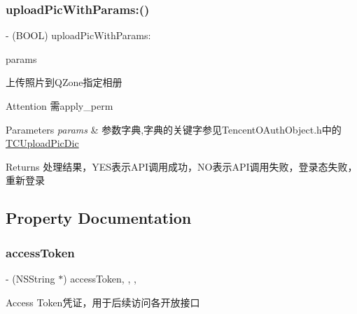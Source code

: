 \subsubsection{\texorpdfstring{upload\+Pic\+With\+Params\+:()}{uploadPicWithParams:()}\hspace{0.1cm}{\footnotesize\ttfamily [2/2]}}
{\footnotesize\ttfamily -\/ (B\+O\+OL) upload\+Pic\+With\+Params\+: \begin{DoxyParamCaption}\item[{(N\+S\+Mutable\+Dictionary $\ast$)}]{params }\end{DoxyParamCaption}}

上传照片到\+Q\+Zone指定相册 \begin{DoxyAttention}{Attention}
需apply\+\_\+perm 
\end{DoxyAttention}

\begin{DoxyParams}{Parameters}
{\em params} & 参数字典,字典的关键字参见\+Tencent\+O\+Auth\+Object.\+h中的\mbox{\hyperlink{interface_t_c_upload_pic_dic}{T\+C\+Upload\+Pic\+Dic}} \\
\hline
\end{DoxyParams}
\begin{DoxyReturn}{Returns}
处理结果，\+Y\+E\+S表示\+A\+P\+I调用成功，\+N\+O表示\+A\+P\+I调用失败，登录态失败，重新登录 
\end{DoxyReturn}


\subsection{Property Documentation}
\mbox{\label{interface_tencent_o_auth_a104b04b7ad6a6e4a3380c79160f087ae}} 
\subsubsection{\texorpdfstring{access\+Token}{accessToken}}
{\footnotesize\ttfamily -\/ (N\+S\+String $\ast$) access\+Token\hspace{0.3cm}{\ttfamily [read]}, {\ttfamily [write]}, {\ttfamily [nonatomic]}, {\ttfamily [copy]}}

Access Token凭证，用于后续访问各开放接口 \mbox{\label{interface_tencent_o_auth_a6a532ce1ed7f95b82e200c735943cb89}} 
